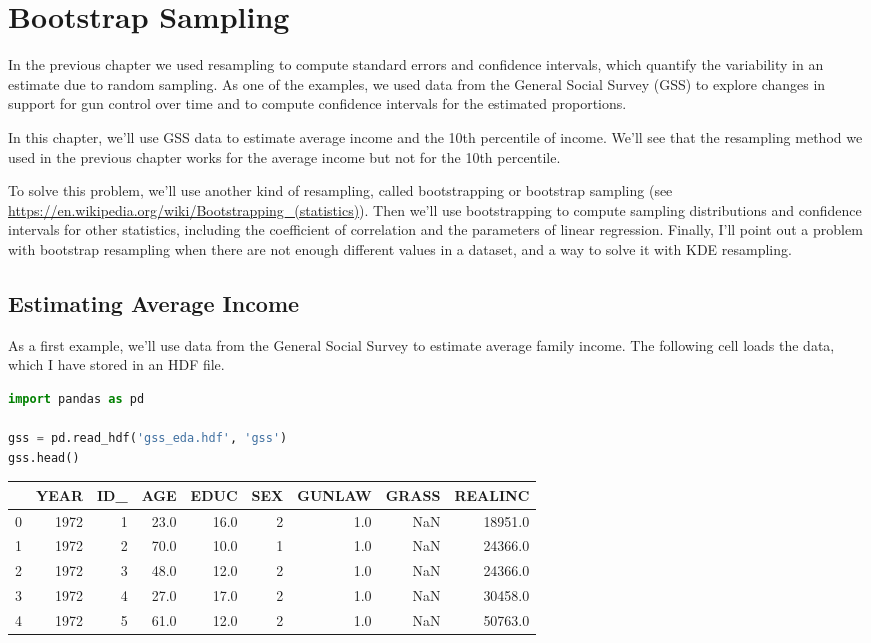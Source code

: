 \hypertarget{bootstrap-sampling}{%
\chapter{Bootstrap Sampling}\label{bootstrap-sampling}}

In the previous chapter we used resampling to compute standard errors
and confidence intervals, which quantify the variability in an estimate
due to random sampling. As one of the examples, we used data from the
General Social Survey (GSS) to explore changes in support for gun
control over time and to compute confidence intervals for the estimated
proportions.

In this chapter, we'll use GSS data to estimate average income and the
10th percentile of income. We'll see that the resampling method we used
in the previous chapter works for the average income but not for the
10th percentile.

To solve this problem, we'll use another kind of resampling, called
bootstrapping or bootstrap sampling (see
\url{https://en.wikipedia.org/wiki/Bootstrapping_(statistics)}). Then
we'll use bootstrapping to compute sampling distributions and confidence
intervals for other statistics, including the coefficient of correlation
and the parameters of linear regression. Finally, I'll point out a
problem with bootstrap resampling when there are not enough different
values in a dataset, and a way to solve it with KDE resampling.

\hypertarget{estimating-average-income}{%
\section{Estimating Average Income}\label{estimating-average-income}}

As a first example, we'll use data from the General Social Survey to
estimate average family income. The following cell loads the data, which
I have stored in an HDF file.

\begin{lstlisting}[language=Python]
import pandas as pd

gss = pd.read_hdf('gss_eda.hdf', 'gss')
gss.head()
\end{lstlisting}

\begin{tabular}{lrrrrrrrr}
\toprule
{} &  YEAR &  ID\_ &   AGE &  EDUC &  SEX &  GUNLAW &  GRASS &  REALINC \\
\midrule
0 &  1972 &    1 &  23.0 &  16.0 &    2 &     1.0 &    NaN &  18951.0 \\
1 &  1972 &    2 &  70.0 &  10.0 &    1 &     1.0 &    NaN &  24366.0 \\
2 &  1972 &    3 &  48.0 &  12.0 &    2 &     1.0 &    NaN &  24366.0 \\
3 &  1972 &    4 &  27.0 &  17.0 &    2 &     1.0 &    NaN &  30458.0 \\
4 &  1972 &    5 &  61.0 &  12.0 &    2 &     1.0 &    NaN &  50763.0 \\
\bottomrule
\end{tabular}

